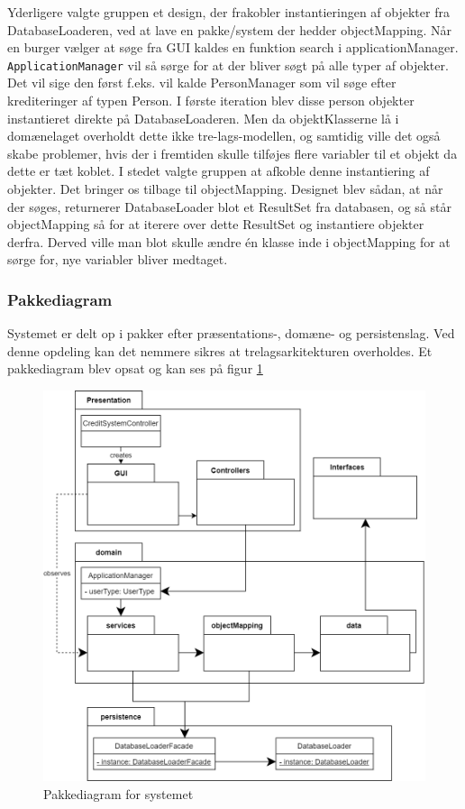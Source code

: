 Yderligere valgte gruppen et design, der frakobler instantieringen af objekter fra DatabaseLoaderen, ved at lave en pakke/system der hedder objectMapping. Når en burger vælger at søge fra GUI kaldes en funktion search i applicationManager. \texttt{ApplicationManager} vil så sørge for at der bliver søgt på alle typer af objekter. Det vil sige den først f.eks. vil kalde PersonManager som vil søge efter krediteringer af typen Person. I første iteration blev disse person objekter instantieret direkte på DatabaseLoaderen. Men da objektKlasserne lå i domænelaget overholdt dette ikke  tre-lags-modellen, og samtidig ville det også skabe problemer, hvis der i fremtiden skulle tilføjes flere variabler til et objekt da dette er tæt koblet. I stedet valgte gruppen at afkoble denne instantiering af objekter. Det bringer os tilbage til objectMapping. Designet blev sådan, at når der søges, returnerer DatabaseLoader blot et ResultSet fra databasen, og så står objectMapping så for at iterere over dette ResultSet og instantiere objekter derfra. Derved ville man blot skulle ændre én klasse inde i objectMapping for at sørge for, nye variabler bliver medtaget.


\subsubsection{Pakkediagram} Systemet er delt op i pakker efter præsentations-,
domæne- og persistenslag. Ved denne opdeling kan det nemmere sikres at
trelagsarkitekturen overholdes. Et pakkediagram blev opsat og kan ses på figur
\ref{fig:PackageDiagram}

\begin{figure}[H]
    \centering
\includegraphics[scale = 0.26]{images/PackageDiagram.png}
    \caption{Pakkediagram for systemet}
    \label{fig:PackageDiagram}
\end{figure}

